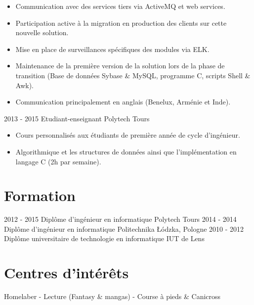 \documentclass[]{friggeri-cv}
\begin{document}
\begin{entrylist}
{\begin{itemize}[leftmargin=*]
		\item Communication avec des services tiers via ActiveMQ et web services.
		\item Participation active à la migration en production des clients sur cette nouvelle solution.
		\item Mise en place de surveillances spécifiques des modules via ELK.
		\item Maintenance de la première version de la solution lors de la phase de transition (Base de données Sybase \& MySQL, programme C, scripts Shell \& Awk).
		\item Communication principalement en anglais (Benelux, Arménie et Inde).	
	\end{itemize}
}
      \vspace{7pt}      
    \entry
    {2013 - 2015}
    {Etudiant-enseignant}
    {Polytech Tours}
    {
    \vspace{-0.8\baselineskip}
	\begin{itemize}[leftmargin=*]
		\item Cours personnalisés aux étudiants de première année de cycle d'ingénieur. 
		\item Algorithmique et les structures de données ainsi que l'implémentation en langage C (2h par semaine).
	\end{itemize}
    }
\end{entrylist}

\section{Formation}
\begin{entrylist}
  \vspace{-6pt}    
  \entry
    {2012 - 2015}
    {Diplôme d'ingénieur en informatique}
    {Polytech Tours}
    {}
  \vspace{-6pt}    
  \entry
    {2014 - 2014}
    {Diplôme d'ingénieur en informatique}
    {Politechnika Łódzka, Pologne}
    {}
  \entry
    {2010 - 2012}
    {Diplôme universitaire de technologie en informatique}
    {IUT de Lens}
    {}
\end{entrylist}

\section{Centres d'intérêts}
\begin{entrylist}
  \entry
    {Homelaber - Lecture (Fantasy \& mangas) - Course à pieds \& Canicross}
    {}    {}    {}
\end{entrylist}
\end{document}
